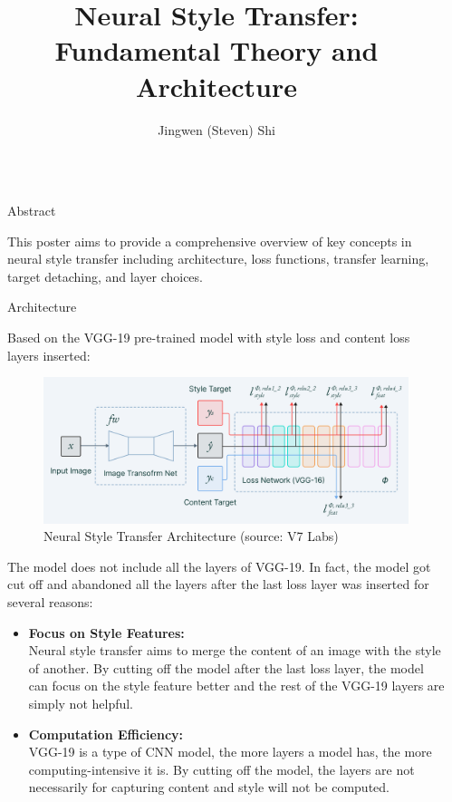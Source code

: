 \documentclass[final]{beamer}
\title{Neural Style Transfer:\\ Fundamental Theory and Architecture}
\author{Jingwen (Steven) Shi}
\institute[shortinst]{University of Toronto}
\newlength{\sepwidth}
\newlength{\colwidth}
\newcommand{\separatorcolumn}{\begin{column}{\sepwidth}\end{column}}
\begin{document}
\begin{frame}[t]
\begin{columns}[t]
\separatorcolumn

\begin{column}{\colwidth}

    \begin{block}{Abstract}
    
        This poster aims to provide a comprehensive overview of key concepts in neural style transfer including architecture, loss functions, transfer learning, target detaching, and layer choices.
    
    \end{block}

    \begin{block}{Architecture}
    
        Based on the VGG-19 pre-trained model with style loss and content loss layers inserted:

        \begin{figure}
          \centering
            \includegraphics[width=1\textwidth]{figures/NST Architecture.png}
        
            \caption{Neural Style Transfer Architecture (source: V7 Labs)}
        \end{figure}
        
        The model does not include all the layers of VGG-19. In fact, the model got cut off and abandoned all the layers after the last loss layer was inserted for several reasons:
        \begin{itemize}
            \item \textbf{Focus on Style Features:\\}
            Neural style transfer aims to merge the content of an image with the style of another. By cutting off the model after the last loss layer, the model can focus on the style feature better and the rest of the VGG-19 layers are simply not helpful.
            \item \textbf{Computation Efficiency:\\}
            VGG-19 is a type of CNN model, the more layers a model has, the more computing-intensive it is. By cutting off the model, the layers are not necessarily for capturing content and style will not be computed.
        \end{itemize}


\end{block}
\end{column}
\end{columns}
\end{frame}
\end{document}
